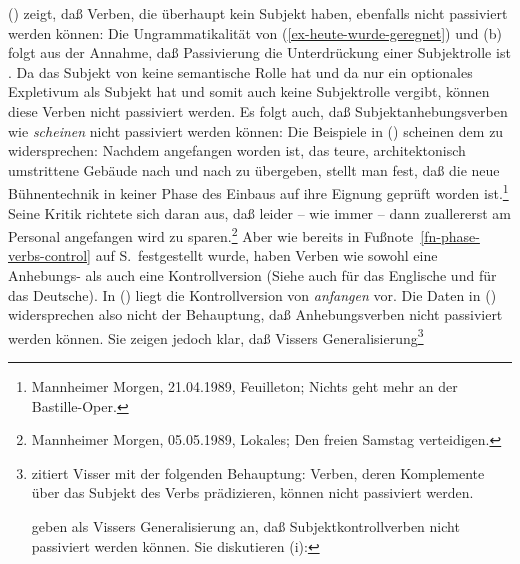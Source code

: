 () zeigt, daß Verben, die überhaupt kein Subjekt haben, ebenfalls nicht passiviert werden können:
\eal
{}
\zl
Die Ungrammatikalität von (\ref{ex-heute-wurde-geregnet}) und (b) folgt
aus der Annahme, daß Passivierung die Unterdrückung einer Subjektrolle\label{ex-ps-demotion-subject-role}
ist \citep[]{ps2}. Da das Subjekt von 
keine semantische Rolle hat und da  nur ein optionales Expletivum
als Subjekt hat und somit auch keine
Subjektrolle vergibt, können diese Verben nicht passiviert werden.
Es folgt auch, daß Subjektanhebungsverben wie \zb \emph{scheinen} nicht passiviert
werden können:\label{subjekt-raising-kein-passiv}
\z
Die Beispiele in () scheinen dem zu widersprechen:
\eal
\ex Nachdem angefangen worden ist, das teure, architektonisch umstrittene Gebäude nach und nach zu übergeben, 
    stellt man fest, daß die neue Bühnentechnik in keiner Phase des Einbaus auf ihre Eignung geprüft worden ist.\footnote{
Mannheimer Morgen, 21.04.1989, Feuilleton; Nichts geht mehr an der Bastille-Oper.%
        }
\ex Seine Kritik richtete sich daran aus, daß leider -- wie immer -- dann zuallererst am Personal angefangen wird zu sparen.\footnote{
       Mannheimer Morgen, 05.05.1989, Lokales; Den freien Samstag verteidigen.%
}
\zl
Aber wie bereits in Fußnote~\ref{fn-phase-verbs-control} auf S.\,\pageref{fn-phase-verbs-control} festgestellt
wurde, haben Verben wie  sowohl eine Anhebungs- als auch
eine Kontrollversion (Siehe auch  für das Englische
und  für das Deutsche). In () liegt die Kontrollversion von \emph{anfangen} vor.
Die Daten in () widersprechen also nicht der Behauptung, daß Anhebungsverben nicht passiviert
werden können. Sie zeigen jedoch klar, 
daß Vissers Generalisierung\footnote{
        \citet[]{Bresnan82c} zitiert Visser mit der folgenden Behauptung:
        Verben, deren Komplemente über das Subjekt des Verbs prädizieren, können nicht passiviert werden.

        \citet[]{ps2} geben als Vissers Generalisierung an,
        daß Subjektkontrollverben nicht passiviert werden können.
        Sie diskutieren (i):
        \eal
        \zllast
}
